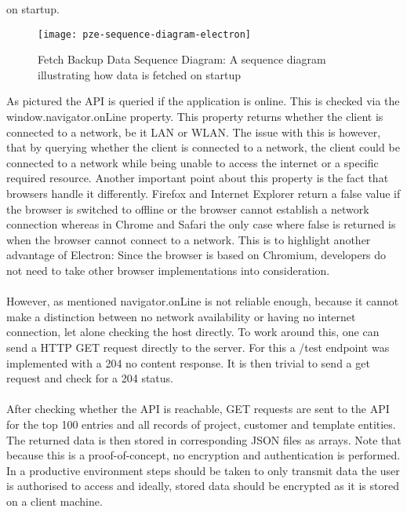 on startup.
\begin{figure}[H]
  \centering
  \label{fig:pze-sequence-diagram-electron}
  \texttt{[image: pze-sequence-diagram-electron]}
  \caption{Fetch Backup Data Sequence Diagram:
  A sequence diagram illustrating how data is fetched on startup}
\end{figure}
As pictured the API is queried if the application is online.
This is checked via the window.navigator.onLine property.
This property returns whether the client is connected to a network, be it LAN or WLAN.
The issue with this is however, that by querying whether the client is connected to a network,
the client could be connected to a network while being unable to access the internet or a specific
required resource.
Another important point about this property is the fact that browsers handle it differently.
Firefox and Internet Explorer return a false value if the browser is switched to offline or the browser
cannot establish a network connection whereas in Chrome and Safari the only case where false is returned
is when the browser cannot connect to a network. \parencite{onLineMdn}
This is to highlight another advantage of Electron: Since the browser is based on Chromium, 
developers do not need to take other browser implementations into consideration.\paragraph{}
However, as mentioned navigator.onLine is not reliable enough, because it cannot make a distinction
between no network availability or having no internet connection, let alone checking the 
host directly.
To work around this, one can send a HTTP GET request directly to the server. 
For this a /test endpoint was implemented with a 204 no content response. 
It is then trivial to send a get request and check for a 204 status.\paragraph{}
After checking whether the API is reachable, GET requests are sent to the API for the top 100 entries
and all records of project, customer and template entities. 
The returned data is then stored in corresponding JSON files as arrays. 
Note that because this is a proof-of-concept, no encryption and authentication is performed.
In a productive environment steps should be taken to only transmit data the user is authorised 
to access and ideally, stored data should be encrypted as it is stored on a client machine.\paragraph{}
